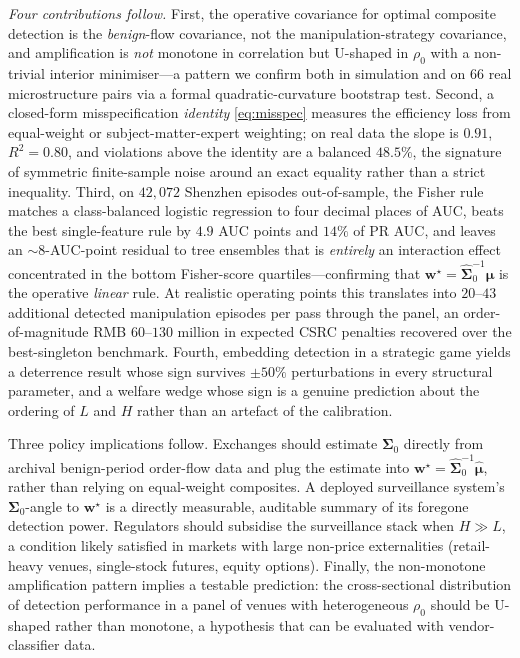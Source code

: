 \documentclass[11pt,a4paper]{article}
\theoremstyle{definition}
\theoremstyle{remark}
\newcommand{\1}{\mathbf{1}}
\newcommand{\w}{\mathbf{w}}
\newcommand{\mmu}{\boldsymbol{\mu}}
\newcommand{\Sig}{\boldsymbol{\Sigma}}
\begin{document}
\noindent\emph{Four contributions follow.} First, the operative covariance for optimal composite detection is the \emph{benign}-flow covariance, not the manipulation-strategy covariance, and amplification is \emph{not} monotone in correlation but U-shaped in $\rho_0$ with a non-trivial interior minimiser---a pattern we confirm both in simulation and on $66$ real microstructure pairs via a formal quadratic-curvature bootstrap test. Second, a closed-form misspecification \emph{identity} \eqref{eq:misspec} measures the efficiency loss from equal-weight or subject-matter-expert weighting; on real data the slope is $0.91$, $R^2 = 0.80$, and violations above the identity are a balanced $48.5\%$, the signature of symmetric finite-sample noise around an exact equality rather than a strict inequality. Third, on $42{,}072$ Shenzhen episodes out-of-sample, the Fisher rule matches a class-balanced logistic regression to four decimal places of AUC, beats the best single-feature rule by $4.9$ AUC points and $14\%$ of PR AUC, and leaves an $\sim 8$-AUC-point residual to tree ensembles that is \emph{entirely} an interaction effect concentrated in the bottom Fisher-score quartiles---confirming that $\w^\star=\widehat{\Sig}_0^{-1}\widehat{\mmu}$ is the operative \emph{linear} rule. At realistic operating points this translates into $20$--$43$ additional detected manipulation episodes per pass through the panel, an order-of-magnitude RMB $60$--$130$ million in expected CSRC penalties recovered over the best-singleton benchmark. Fourth, embedding detection in a strategic game yields a deterrence result whose sign survives $\pm 50\%$ perturbations in every structural parameter, and a welfare wedge whose sign is a genuine prediction about the ordering of $L$ and $H$ rather than an artefact of the calibration.

Three policy implications follow. Exchanges should estimate $\Sig_0$ directly from archival benign-period order-flow data and plug the estimate into $\w^\star=\widehat{\Sig}_0^{-1}\widehat{\mmu}$, rather than relying on equal-weight composites. A deployed surveillance system's $\Sig_0$-angle to $\w^\star$ is a directly measurable, auditable summary of its foregone detection power. Regulators should subsidise the surveillance stack when $H\gg L$, a condition likely satisfied in markets with large non-price externalities (retail-heavy venues, single-stock futures, equity options). Finally, the non-monotone amplification pattern implies a testable prediction: the cross-sectional distribution of detection performance in a panel of venues with heterogeneous $\rho_0$ should be U-shaped rather than monotone, a hypothesis that can be evaluated with vendor-classifier data.
\end{document}
